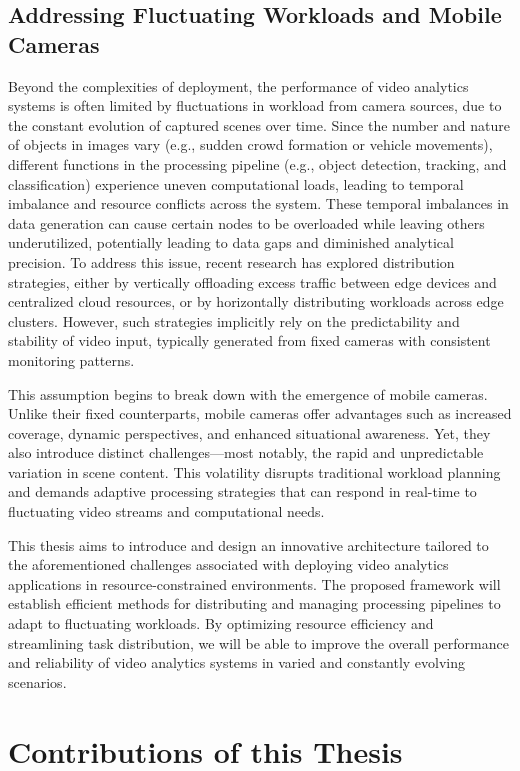 \subsection{Addressing Fluctuating Workloads and Mobile Cameras}

Beyond the complexities of deployment, the performance of video analytics systems is often limited by fluctuations in workload from camera sources, due to the constant evolution of captured scenes over time. Since the number and nature of objects in images vary (e.g., sudden crowd formation or vehicle movements), different functions in the processing pipeline (e.g., object detection, tracking, and classification) experience uneven computational loads, leading to temporal imbalance and resource conflicts across the system. These temporal imbalances in data generation can cause certain nodes to be overloaded while leaving others underutilized, potentially leading to data gaps and diminished analytical precision. To address this issue, recent research has explored distribution strategies, either by vertically offloading excess traffic between edge devices and centralized cloud resources, or by horizontally distributing workloads across edge clusters. However, such strategies implicitly rely on the predictability and stability of video input, typically generated from fixed cameras with consistent monitoring patterns.

This assumption begins to break down with the emergence of mobile cameras. Unlike their fixed counterparts, mobile cameras offer advantages such as increased coverage, dynamic perspectives, and enhanced situational awareness. Yet, they also introduce distinct challenges—most notably, the rapid and unpredictable variation in scene content. This volatility disrupts traditional workload planning and demands adaptive processing strategies that can respond in real-time to fluctuating video streams and computational needs.

This thesis aims to introduce and design an innovative architecture tailored to the aforementioned challenges associated with deploying video analytics applications in resource-constrained environments. The proposed framework will establish efficient methods for distributing and managing processing pipelines to adapt to fluctuating workloads. By optimizing resource efficiency and streamlining task distribution, we will be able to improve the overall performance and reliability of video analytics systems in varied and constantly evolving scenarios.

\section{Contributions of this Thesis}

